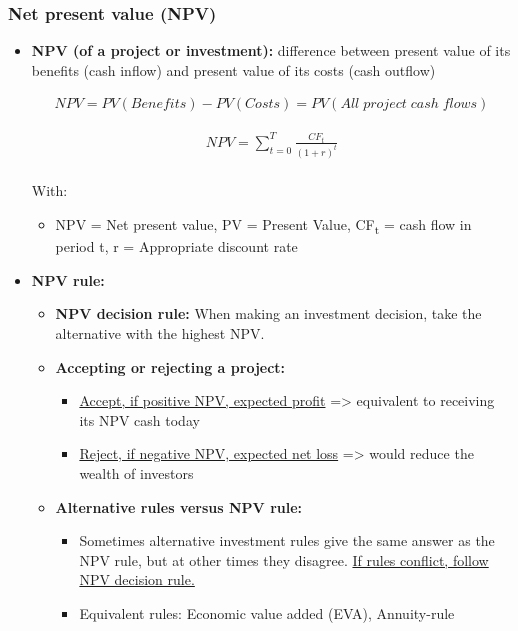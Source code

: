 \documentclass[ieeetran]{article}
\begin{document}
\subsubsection{Net present value (NPV)} %
\label{ssub:net_present_value_nPV_}

\begin{itemize}
  \item \textbf{NPV (of a project or investment):} difference between present value of its benefits (cash inflow) and present value of its costs (cash outflow)

\large
\begin{equation*}
\boxed{
\begin{aligned}
NPV = PV(Benefits) - PV(Costs) =PV(All \; project \; cash \; flows)
\end{aligned}
}
\end{equation*}

\large
\begin{equation*}
\boxed{
\begin{aligned}
	NPV = \sum_{t=0}^{T} \frac{CF_t}{(1 + r)^t} 
\end{aligned}
}
\end{equation*}
\\
\normalsize
With:
\begin{itemize}
	\item NPV = Net present value, PV = Present Value, CF\textsubscript{t} = cash flow in period t, r = Appropriate discount rate
\end{itemize}

\item \textbf{NPV rule:}
	\begin{itemize}
	  \item \textbf{NPV decision rule:} When making an investment decision, take the alternative with the highest NPV.
     	  \item \textbf{Accepting or rejecting a project:}
		  \begin{itemize}
		    \item \underline{Accept, if positive NPV, expected profit} => equivalent to receiving its NPV cash today
		    \item \underline{Reject, if negative NPV, expected net loss} => would reduce the wealth of investors

		  \end{itemize}
	  \item \textbf{Alternative rules versus NPV rule:}
		  \begin{itemize}
		    \item Sometimes alternative investment rules give the same answer as the NPV rule, but at other times they disagree. \underline{If rules conflict, follow NPV decision rule.}
		    \item Equivalent rules: Economic value added (EVA), Annuity-rule
		  \end{itemize}
	\end{itemize}
\end{itemize}
\end{document}
